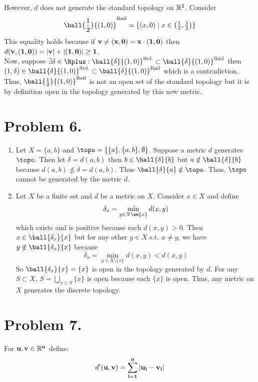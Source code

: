 \documentclass[12pt]{extarticle}
\begin{document}
However, $d$ does not generate the standard topology on $\mathbb{R}^2$. Consider \[\ball{\frac{1}{2}}{(1, 0)}^{\text{Rail}} = \{(x, 0) \mid x \in \left(\tfrac{1}{2}, \tfrac{3}{2} \right) \}\]
This equality holds because if $\bf{v} \neq (x, 0) = x \cdot (1, 0)$ then $d(\bf{v}, (1, 0)) = |\bf{v}| + |(1,0)| \ge 1$. \bigskip \\
Now, suppose $\exists \delta \in \Rplus : \ball{\delta}{(1,0)}^{\text{Std.}} \subset \ball{\delta}{(1,0)}^{\text{Rail}}$ then  \bigskip $(1, \delta) \in \ball{\delta}{(1,0)}^{\text{Std.}} \subset \ball{\delta}{(1,0)}^{\text{Rail}}$ which is a contradiction. \bigskip Thus, $\ball{\frac{1}{2}}{(1, 0)}^{\text{Rail}}$ is not an open set of the standard topology but it is by definition open in the topology generated by this new metric.  

\section*{Problem 6.}

\begin{enumerate}
\item
Let $X = \{a, b \}$ and $\topo = \{\{a \}, \{a,b\}, \emptyset \}$. Suppose a metric $d$ generates $\topo$. Then let $\delta = d(a,b)$ then $b \in \ball{\delta}{b}$ but $a \notin \ball{\delta}{b}$ because $d(a, b) \not\le \delta = d(a,b)$. Thus $\ball{\delta}{a} \notin \topo$. Thus, $\topo$ cannot be generated by the metric $d$.

\item Let $X$ be a finite set and $d$ be a metric on $X$. Consider $x \in X$ and define \[\delta_x = \min\limits_{y \in X \sm \{x\}} d(x,y)\] which exists and is positive because each $d(x, y) > 0$. Then $x \in \ball{\delta_x}{x}$ but for any other $y \in X$ s.t. $x \neq y$, we have $y \notin \ball{\delta_x}{x}$ because \[\delta_x = \min\limits_{y \in X \setminus \{x\}} d(x,y) < d(x,y)\] So $\ball{\delta_x}{x} = \{x\}$ is open in the topology generated by $d$. For any $S \subset X$, $S = \bigcup\limits_{x \in S} \{x\}$ is open because each $\{x\}$ is open. Thus, any metric on $X$ generates the discrete topology. 

\end{enumerate}

\section*{Problem 7.} For $\bf{u}, \bf{v} \in \mathbb{R}^n$ define:
\[d'(\bf{u}, \bf{v}) = \sum\limits_{i = 1}^{n} |u_i - v_i|\]
\end{document}
